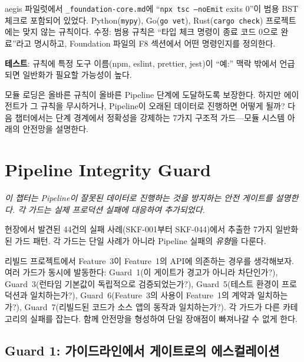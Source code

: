 \documentclass[11pt,a4paper,openright,twoside]{report}
\newcommand{\file}[1]{\texttt{#1}}
\begin{document}
\begin{warnbox}[흔한 위반: 범용 규칙에 도구 이름 사용]
aegis 파일럿에서 \file{\_foundation-core.md}에 ``\texttt{npx tsc --noEmit} exits 0''이 범용 BST 체크로 포함되어 있었다. Python(\texttt{mypy}), Go(\texttt{go vet}), Rust(\texttt{cargo check}) 프로젝트에는 맞지 않는 규칙이다. 수정: 범용 규칙은 ``타입 체크 명령이 종료 코드 0으로 완료''라고 명시하고, Foundation 파일의 F8 섹션에서 어떤 명령인지를 정의한다.

\textbf{테스트}: 규칙에 특정 도구 이름(npm, eslint, prettier, jest)이 ``예:'' 맥락 밖에서 언급되면 일반화가 필요할 가능성이 높다.
\end{warnbox}

모듈 로딩은 올바른 규칙이 올바른 Pipeline 단계에 도달하도록 보장한다. 하지만 에이전트가 그 규칙을 무시하거나, Pipeline이 오래된 데이터로 진행하면 어떻게 될까? 다음 챕터에서는 단계 경계에서 정확성을 강제하는 7가지 구조적 가드---모듈 시스템 아래의 안전망을 설명한다.

\chapter{Pipeline Integrity Guard}
\label{ch:guards}

\textit{이 챕터는 Pipeline이 잘못된 데이터로 진행하는 것을 방지하는 안전 게이트를 설명한다. 각 가드는 실제 프로덕션 실패에 대응하여 추가되었다.}

현장에서 발견된 44건의 실패 사례(SKF-001부터 SKF-044)에서 추출한 7가지 일반화된 가드 패턴. 각 가드는 단일 사례가 아니라 Pipeline 실패의 \emph{유형}을 다룬다.

\begin{tipbox}
리빌드 프로젝트에서 Feature~3이 Feature~1의 API에 의존하는 경우를 생각해보자. 여러 가드가 동시에 발동한다: Guard~1(이 게이트가 경고가 아니라 차단인가?), Guard~3(런타임 기본값이 독립적으로 검증되었는가?), Guard~5(테스트 환경이 프로덕션과 일치하는가?), Guard~6(Feature~3의 사용이 Feature~1의 계약과 일치하는가?), Guard~7(리빌드된 코드가 소스 앱의 동작과 일치하는가?). 각 가드가 다른 카테고리의 실패를 잡는다. 함께 안전망을 형성하여 단일 장애점이 빠져나갈 수 없게 한다.
\end{tipbox}

\section{Guard 1: 가이드라인에서 게이트로의 에스컬레이션}
\end{document}
